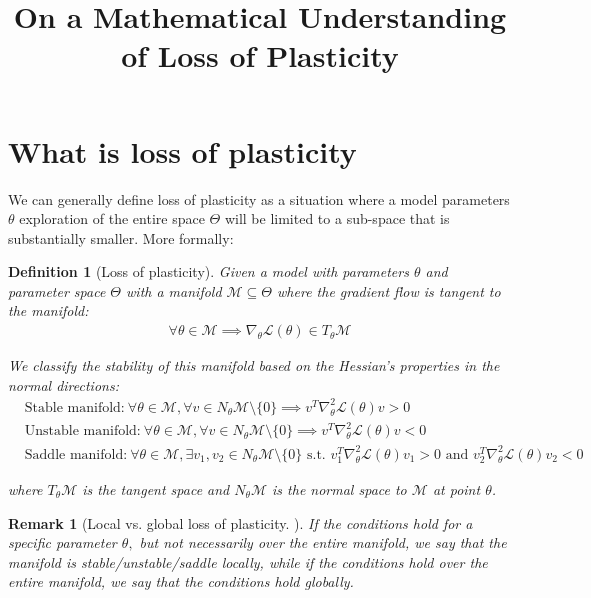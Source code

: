 \documentclass[11pt]{article}
\title{On a Mathematical Understanding of Loss of Plasticity}
\date{}
\newtheorem{definition}{Definition}[section]
\newtheorem{remark}{Remark}[section]
\begin{document}
\maketitle

\section{What is loss of plasticity}
We can generally define loss of plasticity as a situation where a model parameters $\theta$ exploration of the entire space $\Theta$ will be limited to a sub-space  that is substantially smaller. More formally:

\begin{definition}[Loss of plasticity]
    Given a model with parameters $\theta$ and parameter space $\Theta$ with a manifold $\mathcal{M} \subseteq \Theta$ where the gradient flow is tangent to the manifold:
    \begin{align}
        \forall \theta \in \mathcal{M} \implies \nabla_\theta\mathcal{L}(\theta) \in T_\theta\mathcal{M}
    \end{align}
    
    We classify the stability of this manifold based on the Hessian's properties in the normal directions:
    \begin{align}
        &\text{Stable manifold:}\ \forall \theta \in \mathcal{M}, \forall v \in N_\theta\mathcal{M} \setminus \{0\} \implies v^T\nabla_\theta^2 \mathcal{L}(\theta)v > 0 \\
        &\text{Unstable manifold:}\ \forall \theta \in \mathcal{M}, \forall v \in N_\theta\mathcal{M} \setminus \{0\} \implies v^T\nabla_\theta^2 \mathcal{L}(\theta)v < 0 \\
        &\text{Saddle manifold:}\ \forall \theta \in \mathcal{M}, \exists v_1, v_2 \in N_\theta\mathcal{M} \setminus \{0\} \text{ s.t. } v_1^T\nabla_\theta^2 \mathcal{L}(\theta)v_1 > 0 \text{ and } v_2^T\nabla_\theta^2 \mathcal{L}(\theta)v_2 < 0
    \end{align}


    where $T_\theta\mathcal{M}$ is the tangent space and $N_\theta\mathcal{M}$ is the normal space to $\mathcal{M}$ at point $\theta$.
\end{definition}

\begin{remark}[Local vs. global loss of plasticity. ]
 If the conditions hold for a specific parameter $\theta,$ but not necessarily over the entire manifold, we say that the manifold is stable/unstable/saddle \emph{locally}, while if the conditions hold over the entire manifold, we say that the conditions hold \emph{globally}. 
\end{remark}
\end{document}
